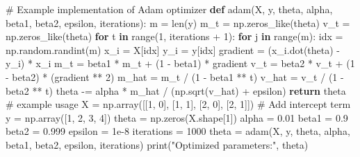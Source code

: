 \documentclass[
  letterpaper,
  DIV=11,
  numbers=noendperiod]{scrreprt}
\newenvironment{Shaded}{\begin{snugshade}}{\end{snugshade}}
\newcommand{\BuiltInTok}[1]{\textcolor[rgb]{0.00,0.23,0.31}{#1}}
\newcommand{\CommentTok}[1]{\textcolor[rgb]{0.37,0.37,0.37}{#1}}
\newcommand{\ControlFlowTok}[1]{\textcolor[rgb]{0.00,0.23,0.31}{\textbf{#1}}}
\newcommand{\DecValTok}[1]{\textcolor[rgb]{0.68,0.00,0.00}{#1}}
\newcommand{\FloatTok}[1]{\textcolor[rgb]{0.68,0.00,0.00}{#1}}
\newcommand{\KeywordTok}[1]{\textcolor[rgb]{0.00,0.23,0.31}{\textbf{#1}}}
\newcommand{\NormalTok}[1]{\textcolor[rgb]{0.00,0.23,0.31}{#1}}
\newcommand{\OperatorTok}[1]{\textcolor[rgb]{0.37,0.37,0.37}{#1}}
\newcommand{\StringTok}[1]{\textcolor[rgb]{0.13,0.47,0.30}{#1}}
\begin{document}
\begin{Shaded}
\begin{Highlighting}[]
\CommentTok{\# Example implementation of Adam optimizer}
\KeywordTok{def}\NormalTok{ adam(X, y, theta, alpha, beta1, beta2, epsilon, iterations):}
\NormalTok{    m }\OperatorTok{=} \BuiltInTok{len}\NormalTok{(y)}
\NormalTok{    m\_t }\OperatorTok{=}\NormalTok{ np.zeros\_like(theta)}
\NormalTok{    v\_t }\OperatorTok{=}\NormalTok{ np.zeros\_like(theta)}
    \ControlFlowTok{for}\NormalTok{ t }\KeywordTok{in} \BuiltInTok{range}\NormalTok{(}\DecValTok{1}\NormalTok{, iterations }\OperatorTok{+} \DecValTok{1}\NormalTok{):}
        \ControlFlowTok{for}\NormalTok{ j }\KeywordTok{in} \BuiltInTok{range}\NormalTok{(m):}
\NormalTok{            idx }\OperatorTok{=}\NormalTok{ np.random.randint(m)}
\NormalTok{            x\_i }\OperatorTok{=}\NormalTok{ X[idx]}
\NormalTok{            y\_i }\OperatorTok{=}\NormalTok{ y[idx]}
\NormalTok{            gradient }\OperatorTok{=}\NormalTok{ (x\_i.dot(theta) }\OperatorTok{{-}}\NormalTok{ y\_i) }\OperatorTok{*}\NormalTok{ x\_i}
\NormalTok{            m\_t }\OperatorTok{=}\NormalTok{ beta1 }\OperatorTok{*}\NormalTok{ m\_t }\OperatorTok{+}\NormalTok{ (}\DecValTok{1} \OperatorTok{{-}}\NormalTok{ beta1) }\OperatorTok{*}\NormalTok{ gradient}
\NormalTok{            v\_t }\OperatorTok{=}\NormalTok{ beta2 }\OperatorTok{*}\NormalTok{ v\_t }\OperatorTok{+}\NormalTok{ (}\DecValTok{1} \OperatorTok{{-}}\NormalTok{ beta2) }\OperatorTok{*}\NormalTok{ (gradient }\OperatorTok{**} \DecValTok{2}\NormalTok{)}
\NormalTok{            m\_hat }\OperatorTok{=}\NormalTok{ m\_t }\OperatorTok{/}\NormalTok{ (}\DecValTok{1} \OperatorTok{{-}}\NormalTok{ beta1 }\OperatorTok{**}\NormalTok{ t)}
\NormalTok{            v\_hat }\OperatorTok{=}\NormalTok{ v\_t }\OperatorTok{/}\NormalTok{ (}\DecValTok{1} \OperatorTok{{-}}\NormalTok{ beta2 }\OperatorTok{**}\NormalTok{ t)}
\NormalTok{            theta }\OperatorTok{{-}=}\NormalTok{ alpha }\OperatorTok{*}\NormalTok{ m\_hat }\OperatorTok{/}\NormalTok{ (np.sqrt(v\_hat) }\OperatorTok{+}\NormalTok{ epsilon)}
    \ControlFlowTok{return}\NormalTok{ theta}
\CommentTok{\# example usage}
\NormalTok{X }\OperatorTok{=}\NormalTok{ np.array([[}\DecValTok{1}\NormalTok{, }\DecValTok{0}\NormalTok{], [}\DecValTok{1}\NormalTok{, }\DecValTok{1}\NormalTok{], [}\DecValTok{2}\NormalTok{, }\DecValTok{0}\NormalTok{], [}\DecValTok{2}\NormalTok{, }\DecValTok{1}\NormalTok{]])  }\CommentTok{\# Add intercept term}
\NormalTok{y }\OperatorTok{=}\NormalTok{ np.array([}\DecValTok{1}\NormalTok{, }\DecValTok{2}\NormalTok{, }\DecValTok{3}\NormalTok{, }\DecValTok{4}\NormalTok{]) }
\NormalTok{theta }\OperatorTok{=}\NormalTok{ np.zeros(X.shape[}\DecValTok{1}\NormalTok{])}
\NormalTok{alpha }\OperatorTok{=} \FloatTok{0.01}
\NormalTok{beta1 }\OperatorTok{=} \FloatTok{0.9}
\NormalTok{beta2 }\OperatorTok{=} \FloatTok{0.999}
\NormalTok{epsilon }\OperatorTok{=} \FloatTok{1e{-}8}
\NormalTok{iterations }\OperatorTok{=} \DecValTok{1000}
\NormalTok{theta }\OperatorTok{=}\NormalTok{ adam(X, y, theta, alpha, beta1, beta2, epsilon, iterations)}
\BuiltInTok{print}\NormalTok{(}\StringTok{"Optimized parameters:"}\NormalTok{, theta)}
\end{Highlighting}
\end{Shaded}
\end{document}
